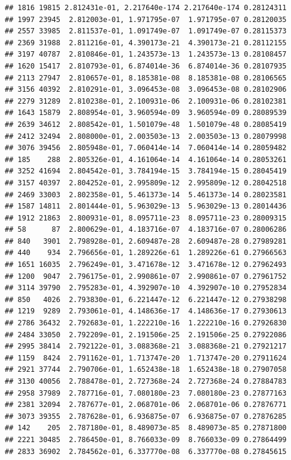\documentclass[
]{article}
\begin{document}
\begin{verbatim}
## 1816 19815 2.812431e-01, 2.217640e-174 2.217640e-174 0.28124311
## 1997 23945  2.812003e-01, 1.971795e-07  1.971795e-07 0.28120035
## 2557 33985  2.811537e-01, 1.091749e-07  1.091749e-07 0.28115373
## 2369 31988  2.811216e-01, 4.390173e-21  4.390173e-21 0.28112155
## 3197 40787  2.810846e-01, 1.243573e-13  1.243573e-13 0.28108457
## 1620 15417  2.810793e-01, 6.874014e-36  6.874014e-36 0.28107935
## 2113 27947  2.810657e-01, 8.185381e-08  8.185381e-08 0.28106565
## 3156 40392  2.810291e-01, 3.096453e-08  3.096453e-08 0.28102906
## 2279 31289  2.810238e-01, 2.100931e-06  2.100931e-06 0.28102381
## 1643 15879  2.808954e-01, 3.960594e-09  3.960594e-09 0.28089539
## 2639 34612  2.808542e-01, 1.501079e-48  1.501079e-48 0.28085419
## 2412 32494  2.808000e-01, 2.003503e-13  2.003503e-13 0.28079998
## 3076 39456  2.805948e-01, 7.060414e-14  7.060414e-14 0.28059482
## 185    288  2.805326e-01, 4.161064e-14  4.161064e-14 0.28053261
## 3252 41694  2.804542e-01, 3.784194e-15  3.784194e-15 0.28045419
## 3157 40397  2.804252e-01, 2.995809e-12  2.995809e-12 0.28042518
## 2469 33003  2.802358e-01, 5.461373e-14  5.461373e-14 0.28023581
## 1587 14811  2.801444e-01, 5.963029e-13  5.963029e-13 0.28014436
## 1912 21863  2.800931e-01, 8.095711e-23  8.095711e-23 0.28009315
## 58      87  2.800629e-01, 4.183716e-07  4.183716e-07 0.28006286
## 840   3901  2.798928e-01, 2.609487e-28  2.609487e-28 0.27989281
## 440    934  2.796656e-01, 1.289226e-61  1.289226e-61 0.27966563
## 1651 16035  2.796249e-01, 3.471678e-12  3.471678e-12 0.27962493
## 1200  9047  2.796175e-01, 2.990861e-07  2.990861e-07 0.27961752
## 3114 39790  2.795283e-01, 4.392907e-10  4.392907e-10 0.27952834
## 850   4026  2.793830e-01, 6.221447e-12  6.221447e-12 0.27938298
## 1219  9289  2.793061e-01, 4.148636e-17  4.148636e-17 0.27930613
## 2786 36432  2.792683e-01, 1.222210e-16  1.222210e-16 0.27926830
## 2484 33050  2.792209e-01, 2.191506e-25  2.191506e-25 0.27922086
## 2995 38414  2.792122e-01, 3.088368e-21  3.088368e-21 0.27921217
## 1159  8424  2.791162e-01, 1.713747e-20  1.713747e-20 0.27911624
## 2921 37744  2.790706e-01, 1.652438e-18  1.652438e-18 0.27907058
## 3130 40056  2.788478e-01, 2.727368e-24  2.727368e-24 0.27884783
## 2958 37989  2.787716e-01, 7.080180e-23  7.080180e-23 0.27877163
## 2381 32094  2.787677e-01, 2.068701e-06  2.068701e-06 0.27876771
## 3073 39355  2.787628e-01, 6.936875e-07  6.936875e-07 0.27876285
## 142    205  2.787180e-01, 8.489073e-85  8.489073e-85 0.27871800
## 2221 30485  2.786450e-01, 8.766033e-09  8.766033e-09 0.27864499
## 2833 36902  2.784562e-01, 6.337770e-08  6.337770e-08 0.27845615

\end{verbatim}
\end{document}
